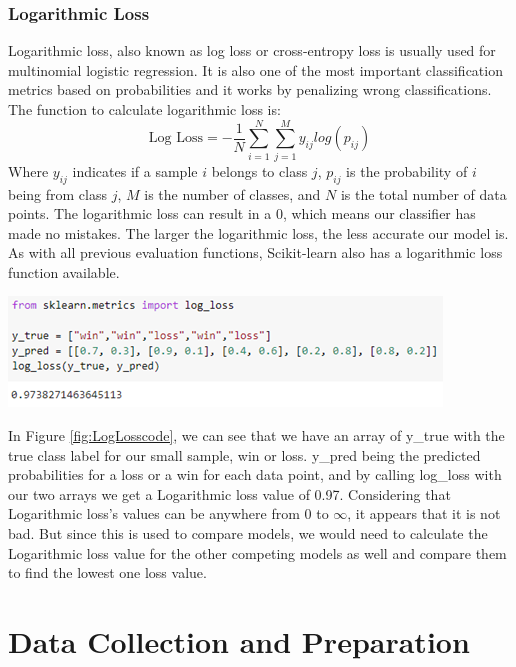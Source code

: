 \documentclass[a4paper,12pt]{report}
\begin{document}
\subsubsection{Logarithmic Loss}

Logarithmic loss, also known as log loss or cross-entropy loss is usually used for multinomial logistic regression. It is also one of the most important classification metrics based on probabilities and it works by penalizing wrong classifications. The function to calculate logarithmic loss is:
$$\text{Log Loss} = -\frac{1}{N}\sum_{i=1}^N\sum_{j=1}^My_{ij}log(p_{ij})$$
Where $y_{ij}$ indicates if a sample $i$ belongs to class $j$, $p_{ij}$ is the probability of $i$ being from class $j$, $M$ is the number of classes, and $N$ is the total number of data points. The logarithmic loss can result in a 0, which means our classifier has made no mistakes. The larger the logarithmic loss, the less accurate our model is. As with all previous evaluation functions, Scikit-learn also has a logarithmic loss function available.

\begin{center}
    \captionsetup{type=figure}
    \includegraphics[width=.9\linewidth]{media/LogLosscode.png}
    \label{fig:LogLosscode}
\end{center}

In Figure \ref{fig:LogLosscode}, we can see that we have an array of y\_true with the true class label for our small sample, win or loss. y\_pred being the predicted probabilities for a loss or a win for each data point, and by calling log\_loss with our two arrays we get a Logarithmic loss value of 0.97. Considering that Logarithmic loss’s values can be anywhere from 0 to $\infty$, it appears that it is not bad. But since this is used to compare models, we would need to calculate the Logarithmic loss value for the other competing models as well and compare them to find the lowest one loss value.

\section{Data Collection and Preparation}
\end{document}

